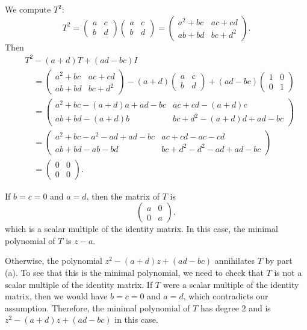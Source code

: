 \begin{solution}\leavevmode
\begin{parts}
\item We compute $T^2$:
  \[ T^2=\begin{pmatrix} a & c\\ b & d \end{pmatrix}
         \begin{pmatrix} a & c\\ b & d \end{pmatrix}
        =\begin{pmatrix} a^2+bc & ac+cd\\ ab+bd & bc+d^2 \end{pmatrix}. \]
  Then
  \begin{align*}
  &T^2-(a+d)T+(ad-bc)I\\
  &\quad=\begin{pmatrix} a^2+bc & ac+cd\\ ab+bd & bc+d^2 \end{pmatrix}
     -(a+d)\begin{pmatrix} a & c\\ b & d \end{pmatrix}
     +(ad-bc)\begin{pmatrix} 1 & 0\\ 0 & 1 \end{pmatrix}\\
  &\quad=\begin{pmatrix} a^2+bc-(a+d)a+ad-bc & ac+cd-(a+d)c\\
     ab+bd-(a+d)b & bc+d^2-(a+d)d+ad-bc \end{pmatrix}\\
  &\quad=\begin{pmatrix} a^2+bc-a^2-ad+ad-bc & ac+cd-ac-cd\\
     ab+bd-ab-bd & bc+d^2-d^2-ad+ad-bc \end{pmatrix}\\
  &\quad=\begin{pmatrix} 0 & 0\\ 0 & 0 \end{pmatrix}.
  \end{align*}
\item If $b=c=0$ and $a=d$, then the matrix of $T$ is
  \[ \begin{pmatrix} a & 0\\ 0 & a \end{pmatrix}, \]
  which is a scalar multiple of the identity matrix. In this case, the minimal
  polynomial of $T$ is $z-a$.

  Otherwise, the polynomial $z^2-(a+d)z+(ad-bc)$ annihilates $T$ by part (a).
  To see that this is the minimal polynomial, we need to check that $T$ is not
  a scalar multiple of the identity matrix. If $T$ were a scalar multiple of
  the identity matrix, then we would have $b=c=0$ and $a=d$, which contradicts
  our assumption. Therefore, the minimal polynomial of $T$ has degree $2$ and
  is $z^2-(a+d)z+(ad-bc)$ in this case. \qedhere
\end{parts}
\end{solution}

